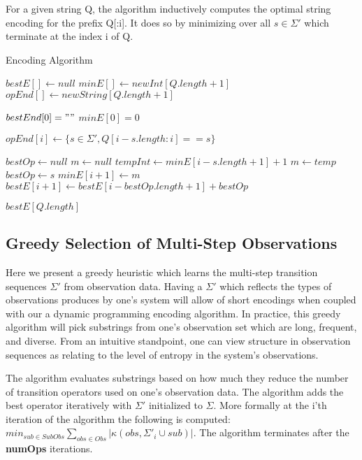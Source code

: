 For a given string Q, the algorithm inductively computes the optimal string encoding for the prefix Q[:i]. It does so by minimizing over all $s \in \Sigma'$ which terminate at the index i of Q.

\begin{algorithm}
\caption{Encoding Algorithm}
\label{Encoding Algorithm}
\begin{algorithmic}[1]

\State $bestE[] \gets null$
\State $minE[] \gets new Int[Q.length+1]$
\State $opEnd[] \gets new String[Q.length+1]$

\State $bestEnd[0] = ""$
\State $minE[0] = 0$

	 \State $opEnd[i] \gets \{s \in \Sigma', Q[i-s.length:i] == s\}$
\EndFor

	\State $bestOp \gets null$
	\State $m \gets null$ 
		\State $tempInt \gets minE[i-s.length+1] + 1$
			\State $m \gets temp$ 
			\State $bestOp \gets s$
		\EndIf
	\EndFor
	\State $minE[i+1] \gets m$
	\State $bestE[i+1] \gets bestE[i-bestOp.length+1] + bestOp$
\EndFor

\Return $bestE[Q.length]$

\EndProcedure
\end{algorithmic}
\end{algorithm}

\subsection{Greedy Selection of Multi-Step Observations}

Here we present a greedy heuristic which learns the multi-step transition sequences $\Sigma'$ from observation data. Having a $\Sigma'$ which reflects the types of observations produces by one's system will allow of short encodings when coupled with our a dynamic programming encoding algorithm. In practice, this greedy algorithm will pick substrings from one's observation set which are long, frequent, and diverse. From an intuitive standpoint, one can view structure in observation sequences as relating to the level of entropy in the system's observations. 

The algorithm evaluates substrings based on how much they reduce the number of transition operators used on one's observation data. The algorithm adds the best operator iteratively with $\Sigma'$ initialized to $\Sigma$. More formally at the i'th iteration of the algorithm the following is computed: $min_{sub \in SubObs} \sum\nolimits_{obs \in Obs}|\kappa(obs,\Sigma'_i \cup sub)|$. The algorithm terminates after the \textbf{numOps} iterations. 

